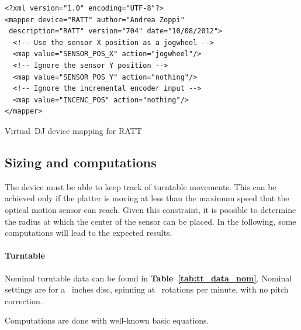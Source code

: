 \documentclass[a4paper,10pt]{article}
\makeatletter
\newenvironment{figurehere}{\def\@captype{figure}\vspace{2ex}}{\vspace{2ex}}
\newcommand{\citet}[1]{\textbf{Table~\ref{#1}}}
\makeatother
\begin{document}
\begin{multicols}{2}
\begin{figurehere}
\begin{mdframed}[
	innerleftmargin=4pt,
	innerrightmargin=4pt,
	innertopmargin=0pt,
	innerbottommargin=0pt
]
\begin{lstlisting}[language=simpleXML]
<?xml version="1.0" encoding="UTF-8"?>
<mapper device="RATT" author="Andrea Zoppi"
 description="RATT" version="704" date="10/08/2012">
  <!-- Use the sensor X position as a jogwheel -->
  <map value="SENSOR_POS_X" action="jogwheel"/>
  <!-- Ignore the sensor Y position -->
  <map value="SENSOR_POS_Y" action="nothing"/>
  <!-- Ignore the incremental encoder input -->
  <map value="INCENC_POS" action="nothing"/>
</mapper>
\end{lstlisting}
\end{mdframed}
\caption{Virtual~DJ device mapping for RATT}
\label{fig:vdj_device_map}
\end{figurehere}


\subsection{Sizing and computations}

The device must be able to keep track of turntable movements. This can be
achieved only if the platter is moving at less than the maximum speed that
the optical motion sensor can reach. Given this constraint, it is possible to
determine the radius at which the center of the sensor can be placed. In the
following, some computations will lead to the expected results.


\paragraph{Turntable}
Nominal turntable data can be found in \citet{tab:tt_data_nom}. Nominal
settings are for a \ttDiscDiam\ inches disc, spinning at \ttNomAngSpeed\ 
rotations per minute, with no pitch correction.

Computations are done with well-known basic equations.


\end{multicols}
\end{document}
